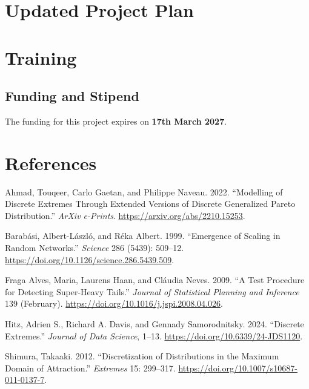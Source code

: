 \documentclass[
  10pt,
  a4paper,
]{scrreprt}
\newlength{\cslhangindent}
\newlength{\cslentryspacingunit} %
\newenvironment{CSLReferences}[2] %
 {%
  \setlength{\parindent}{0pt}
  \ifodd #1
  \let\oldpar\par
  \def\par{\hangindent=\cslhangindent\oldpar}
  \fi
  \setlength{\parskip}{#2\cslentryspacingunit}
 }%
 {}
\theoremstyle{plain}
\theoremstyle{plain}
\theoremstyle{definition}
\theoremstyle{plain}
\theoremstyle{remark}
\begin{document}
{\appendix

\hypertarget{updated-project-plan}{%
\chapter{Updated Project Plan}\label{updated-project-plan}}

\hypertarget{training}{%
\chapter{Training}\label{training}}

\hypertarget{funding-and-stipend}{%
\section*{Funding and Stipend}\label{funding-and-stipend}}

The funding for this project expires on \textbf{17th March 2027}.

\hypertarget{references}{%
\chapter*{References}\label{references}}

\hypertarget{refs}{}
\begin{CSLReferences}{1}{0}
\leavevmode{}%
Ahmad, Touqeer, Carlo Gaetan, and Philippe Naveau. 2022. {``Modelling of
Discrete Extremes Through Extended Versions of Discrete Generalized
Pareto Distribution.''} \emph{ArXiv e-Prints}.
\url{https://arxiv.org/abs/2210.15253}.

\leavevmode{}%
Barabási, Albert-László, and Réka Albert. 1999. {``Emergence of Scaling
in Random Networks.''} \emph{Science} 286 (5439): 509--12.
\url{https://doi.org/10.1126/science.286.5439.509}.

\leavevmode{}%
Fraga Alves, Maria, Laurens Haan, and Cláudia Neves. 2009. {``A Test
Procedure for Detecting Super-Heavy Tails.''} \emph{Journal of
Statistical Planning and Inference} 139 (February).
\url{https://doi.org/10.1016/j.jspi.2008.04.026}.

\leavevmode{}%
Hitz, Adrien S., Richard A. Davis, and Gennady Samorodnitsky. 2024.
{``Discrete Extremes.''} \emph{Journal of Data Science}, 1--13.
\url{https://doi.org/10.6339/24-JDS1120}.

\leavevmode{}%
Shimura, Takaaki. 2012. {``Discretization of Distributions in the
Maximum Domain of Attraction.''} \emph{Extremes} 15: 299--317.
\url{https://doi.org/10.1007/s10687-011-0137-7}.

\end{CSLReferences}
\end{document}
